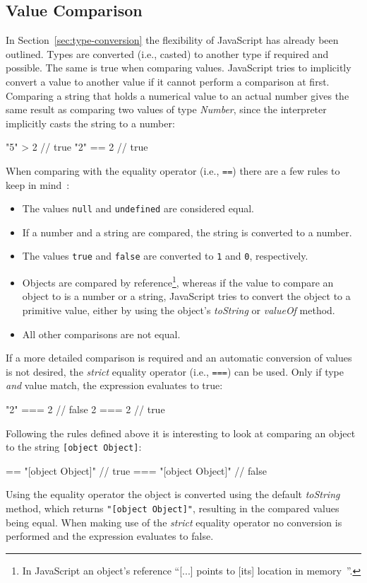 \subsection{Value Comparison}
\label{sec:value-comparison}

In Section~\ref{sec:type-conversion} the flexibility of JavaScript has already been outlined. Types are converted (i.e., casted) to another type if required and possible.  The same is true when comparing values. JavaScript tries to implicitly convert a value to another value if it cannot perform a comparison at first. Comparing a string that holds a numerical value to an actual number gives the same result as comparing two values of type \emph{Number}, since the interpreter implicitly casts the string to a number:
\begin{JsCode}[numbers=none]
"5" > 2 // true
"2" == 2 // true
\end{JsCode}
When comparing with the equality operator (i.e., \texttt{==}) there are a few rules to keep in mind~\cite[p.~72]{JavaScriptTheDefinitiveGuide:Flanagan:2011}:
\begin{itemize}
  \item The values \texttt{null} and \texttt{undefined} are considered equal.
  \item If a number and a string are compared, the string is converted to a number.
  \item The values \texttt{true} and \texttt{false} are converted to \texttt{1} and \texttt{0}, respectively.
  \item Objects are compared by reference\footnote{In JavaScript an object's reference ``[...] points to [its] location in memory~\cite{ByValueByReference:Aggarwal:2017}''.}, whereas if the value to compare an object to is a number or a string, JavaScript tries to convert the object to a primitive value, either by using the object's \emph{toString} or \emph{valueOf} method.
  \item All other comparisons are not equal.
\end{itemize}
If a more detailed comparison is required and an automatic conversion of values is not desired, the \emph{strict} equality operator (i.e., \texttt{===}) can be used. Only if type \emph{and} value match, the expression evaluates to true:
\begin{JsCode}[numbers=none]
"2" === 2 // false
2 === 2   // true
\end{JsCode}
Following the rules defined above it is interesting to look at comparing an object to the string \texttt{[object Object]}:
\begin{JsCode}[numbers=none]
{} == "[object Object]"  // true
{} === "[object Object]" // false
\end{JsCode}
Using the equality operator the object is converted using the default \emph{toString} method, which returns \texttt{"[object Object]"}, resulting in the compared values being equal. When making use of the \emph{strict} equality operator no conversion is performed and the expression evaluates to false.

